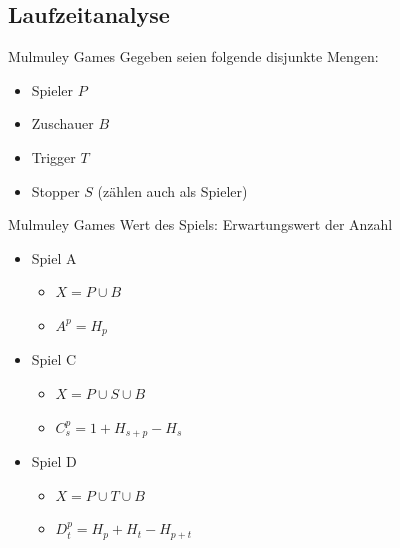 \documentclass[t]{beamer}
\theoremstyle{plain}
\begin{document}
\subsection{Laufzeitanalyse}
\begin{frame}{Mulmuley Games}
    Gegeben seien folgende disjunkte Mengen:
    \begin{itemize}
        \item Spieler $P$
        \item Zuschauer $B$
        \item Trigger $T$
        \item Stopper $S$ (zählen auch als Spieler)
    \end{itemize}




\end{frame}
\begin{frame}{Mulmuley Games}
    Wert des Spiels: Erwartungswert der Anzahl
    \begin{itemize}
        \item Spiel A
        \begin{itemize}
            \item $X = P \cup B$
            \item $A^p = H_p$
        \end{itemize}
        \item Spiel C
        \begin{itemize}
            \item $X = P \cup S \cup B$
            \item $C_s^p = 1 + H_{s+p} - H_s$
        \end{itemize}
        \item Spiel D
        \begin{itemize}
            \item $X = P \cup T \cup B$
            \item $D_t^p = H_p + H_t - H_{p+t}$
        \end{itemize}
    \end{itemize}
\end{frame}
\end{document}
